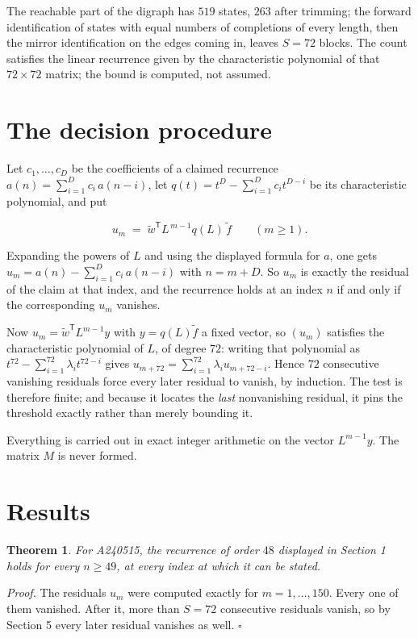 \documentclass[11pt]{article}
\newtheorem{theorem}{Theorem}
\theoremstyle{definition}
\begin{document}
The reachable part of the digraph has $519$ states, $263$ after trimming; the forward identification of states with equal numbers of completions of every length, then the mirror identification on the edges coming in, leaves $S = 72$ blocks. The count satisfies the linear recurrence given by the characteristic polynomial of that $72\times72$ matrix; the bound is computed, not assumed.

\section{The decision procedure}

Let $c_1,\dots,c_D$ be the coefficients of a claimed recurrence $a(n) = \sum_{i=1}^{D} c_i\,a(n-i)$, let $q(t) = t^{D} - \sum_{i=1}^{D} c_i t^{D-i}$ be its characteristic polynomial, and put

\[u_m \;=\; \tilde w^{\mathsf T} L^{\,m-1} q(L)\,\tilde f \qquad (m \ge 1).\]

Expanding the powers of $L$ and using the displayed formula for $a$, one gets $u_m = a(n) - \sum_{i=1}^{D} c_i\,a(n-i)$ with $n = m + D$. So $u_m$ is exactly the residual of the claim at that index, and the recurrence holds at an index $n$ if and only if the corresponding $u_m$ vanishes.

Now $u_m = \tilde w^{\mathsf T} L^{m-1} y$ with $y = q(L)\tilde f$ a fixed vector, so $(u_m)$ satisfies the characteristic polynomial of $L$, of degree $72$: writing that polynomial as $t^{72} - \sum_{i=1}^{72} \lambda_i t^{72-i}$ gives $u_{m+72} = \sum_{i=1}^{72} \lambda_i u_{m+72-i}$. Hence $72$ consecutive vanishing residuals force every later residual to vanish, by induction. The test is therefore finite; and because it locates the {\itshape last} nonvanishing residual, it pins the threshold exactly rather than merely bounding it.

Everything is carried out in exact integer arithmetic on the vector $L^{m-1}y$. The matrix $M$ is never formed.

\section{Results}

\begin{theorem} For A240515, the recurrence of order $48$ displayed in Section 1 holds for every $n \ge 49$, at every index at which it can be stated.\end{theorem}

{\itshape Proof.} The residuals $u_m$ were computed exactly for $m = 1,\dots,150$. Every one of them vanished. After it, more than $S = 72$ consecutive residuals vanish, so by Section 5 every later residual vanishes as well. $\square$
\end{document}
